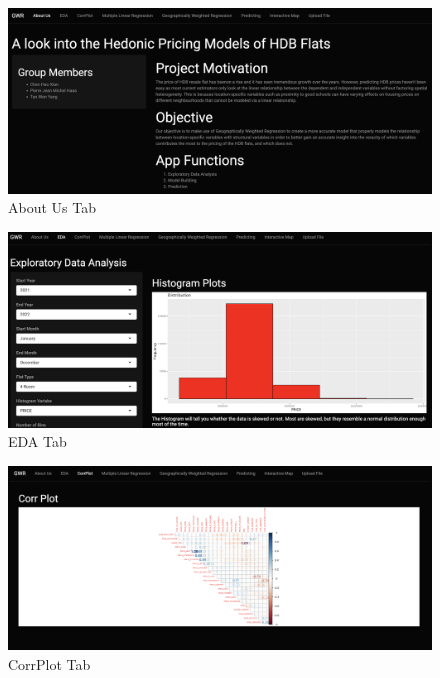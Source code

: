 \documentclass[manuscript,screen]{acmart}
\begin{document}
\begin{figure}

{\centering \includegraphics{images/Screenshot 2023-04-14 at 11.08.12 PM.png}

}

\caption{\label{fig-1}About Us Tab}

\end{figure}

\begin{figure}

{\centering \includegraphics{images/Screenshot 2023-04-14 at 11.34.06 PM.png}

}

\caption{\label{fig-2}EDA Tab}

\end{figure}

\begin{figure}

{\centering \includegraphics{images/Screenshot 2023-04-14 at 11.41.50 PM.png}

}

\caption{\label{fig-3}CorrPlot Tab}

\end{figure}
\end{document}
